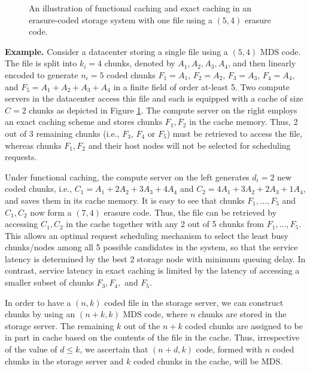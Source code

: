 \begin{figure}[!thbp]
\vspace{-2mm}
\begin{center}
\vspace{-3mm}
\caption{An illustration of functional caching and exact caching in an erasure-coded storage system with one file using a $(5,4)$ erasure code.}
\label{fig:conv}
\end{center}
\end{figure}


{\noindent \bf Example.} Consider a datacenter storing a single file using a $(5,4)$ MDS code. The file is split into $k_i=4$ chunks, denoted by $A_1,A_2,A_3,A_4$, and then linearly encoded to generate $n_i=5$ coded chunks $F_1=A_1$, $F_2=A_2$, $F_3=A_3$, $F_4=A_4$, and $F_5=A_1+A_2+A_3+A_4$ in a  finite field of order at-least 5. Two compute servers in the datacenter access this file and each is equipped with a cache of size $C=2$ chunks as depicted in Figure \ref{fig:conv}. The compute server on the right employs an exact caching scheme and stores chunks $F_1,F_2$ in the cache memory. Thus, 2 out of 3 remaining chunks (i.e., $F_3$, $F_4$ or $F_5$) must be retrieved to access the file, whereas chunks $F_1,F_2$ and their host nodes will not be selected for scheduling requests.


Under functional caching, the compute server on the left generates
$d_i=2$ new coded chunks, i.e., $C_1=A_1+2A_2+3A_3+4A_4$ and $C_2=4A_1+3A_2+2A_3+1A_4$, and saves them in its cache memory. It is easy to see that chunks $F_1,\ldots,F_5$ and $C_1,C_2$ now form a $(7,4)$ erasure code. Thus, the file can be retrieved by accessing $C_1,C_2$ in the cache together with any 2 out of 5 chunks from $F_1,\ldots,F_5$. This allows an optimal request scheduling mechanism to select the least busy chunks/nodes among all 5 possible candidates in the system, so that the service latency is determined by the best 2 storage node with minimum queuing delay. In contrast, service latency in exact caching is limited by the latency of accessing a smaller subset of chunks $F_3,F_4,$ and $F_5$.

In order to have a $(n,k)$ coded file in the storage server, we can construct chunks by using an $(n+k,k)$ MDS code, where $n$ chunks are stored in the storage server. The remaining $k$ out of the $n+k$ coded chunks are assigned to be in part in cache based on the contents of the file in the cache. Thus, irrespective of the value of $d\le k$, we ascertain that $(n+d,k)$ code, formed with $n$ coded chunks in the storage server and $k$ coded chunks in the cache, will be MDS. 